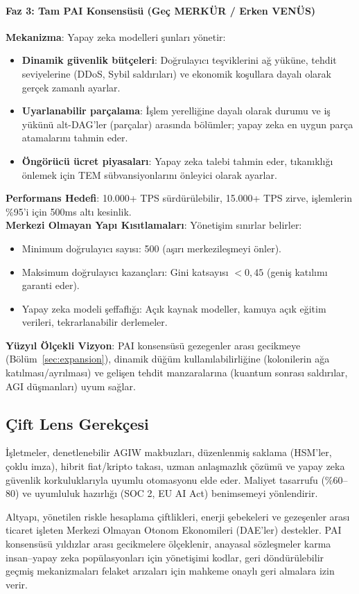 \documentclass[11pt]{article}
\begin{document}
\paragraph{Faz 3: Tam PAI Konsensüsü (Geç MERKÜR / Erken VENÜS)}
\textbf{Mekanizma}: Yapay zeka modelleri şunları yönetir:
\begin{itemize}[noitemsep]
  \item \textbf{Dinamik güvenlik bütçeleri}: Doğrulayıcı teşviklerini ağ yüküne, tehdit seviyelerine (DDoS, Sybil saldırıları) ve ekonomik koşullara dayalı olarak gerçek zamanlı ayarlar.
  \item \textbf{Uyarlanabilir parçalama}: İşlem yerelliğine dayalı olarak durumu ve iş yükünü alt-DAG'ler (parçalar) arasında bölümler; yapay zeka en uygun parça atamalarını tahmin eder.
  \item \textbf{Öngörücü ücret piyasaları}: Yapay zeka talebi tahmin eder, tıkanıklığı önlemek için TEM sübvansiyonlarını önleyici olarak ayarlar.
\end{itemize}
\textbf{Performans Hedefi}: 10.000+ TPS sürdürülebilir, 15.000+ TPS zirve, işlemlerin \%95'i için 500ms altı kesinlik.\\
\textbf{Merkezi Olmayan Yapı Kısıtlamaları}: Yönetişim sınırlar belirler:
\begin{itemize}[noitemsep]
  \item Minimum doğrulayıcı sayısı: 500 (aşırı merkezileşmeyi önler).
  \item Maksimum doğrulayıcı kazançları: Gini katsayısı $<0,45$ (geniş katılımı garanti eder).
  \item Yapay zeka modeli şeffaflığı: Açık kaynak modeller, kamuya açık eğitim verileri, tekrarlanabilir derlemeler.
\end{itemize}
\textbf{Yüzyıl Ölçekli Vizyon}: PAI konsensüsü gezegenler arası gecikmeye (Bölüm~\ref{sec:expansion}), dinamik düğüm kullanılabilirliğine (kolonilerin ağa katılması/ayrılması) ve gelişen tehdit manzaralarına (kuantum sonrası saldırılar, AGI düşmanları) uyum sağlar.

\subsection{Çift Lens Gerekçesi}
\begin{description}[style=nextline]
  \item[Yakın Dönem (MERKÜR Dönemi)] İşletmeler, denetlenebilir AGIW makbuzları, düzenlenmiş saklama (HSM'ler, çoklu imza), hibrit fiat/kripto takası, uzman anlaşmazlık çözümü ve yapay zeka güvenlik korkuluklarıyla uyumlu otomasyonu elde eder. Maliyet tasarrufu (\%60--80) ve uyumluluk hazırlığı (SOC 2, EU AI Act) benimsemeyi yönlendirir.
  \item[Yüzyıl Ölçeği (VENÜS'ten ANDROMEDA'ya)] Altyapı, yönetilen riskle hesaplama çiftlikleri, enerji şebekeleri ve gezeşenler arası ticaret işleten Merkezi Olmayan Otonom Ekonomileri (DAE'ler) destekler. PAI konsensüsü yıldızlar arası gecikmelere ölçeklenir, anayasal sözleşmeler karma insan--yapay zeka popülasyonları için yönetişimi kodlar, geri döndürülebilir geçmiş mekanizmaları felaket arızaları için mahkeme onaylı geri almalara izin verir.
\end{description}
\end{document}
